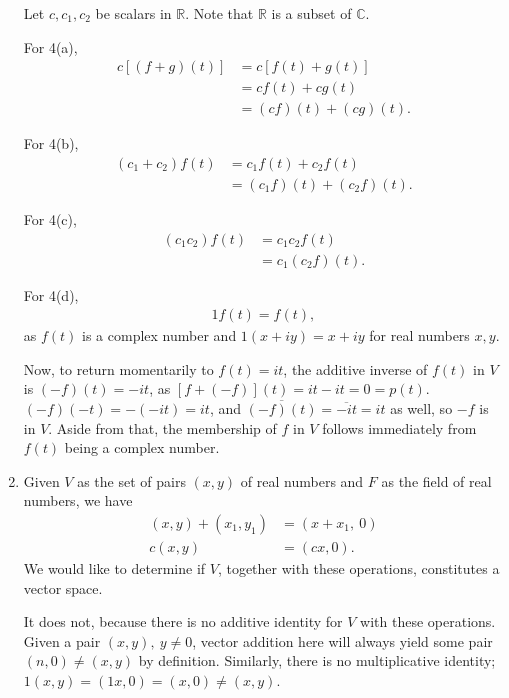\documentclass[12pt]{article}
\begin{document}
\begin{enumerate}
    Let $c,c_1,c_2$ be scalars in $\mathbb{R}$. Note that $\mathbb{R}$ is a subset of
    $\mathbb{C}$.

    For 4(a),
    \begin{align*}
      c[(f + g)(t)] &= c[f(t) + g(t)]\\
                    &= cf(t) + cg(t)\\
                    &= (cf)(t) + (cg)(t).
    \end{align*}

    For 4(b),
    \begin{align*}
      (c_1 + c_2)f(t) &= c_1f(t) + c_2f(t)\\
                      &= (c_1f)(t) + (c_2f)(t).
    \end{align*}

    For 4(c),
    \begin{align*}
      (c_1c_2)f(t) &= c_1c_2f(t)\\
                   &= c_1(c_2f)(t).
    \end{align*}

    For 4(d),
    \begin{align*}
      1f(t) = f(t),
    \end{align*}
    as $f(t)$ is a complex number and $1(x + iy) = x + iy$ for real numbers $x,y$.

    Now, to return momentarily to $f(t) = it$, the additive inverse of $f(t)$ in $V$
    is $(-f)(t) = -it$, as $[f + (-f)](t) = it - it = 0 = p(t)$. $(-f)(-t) = -(-it) =
    it$, and $\overline{(-f)(t)} = \overline{-it} = it$ as well, so $-f$ is in $V$.
    Aside from that, the membership of $f$ in $V$ follows immediately from $f(t)$
    being a complex number.

  \item
    Given $V$ as the set of pairs $(x,y)$ of real numbers and $F$ as the field of
    real numbers, we have
    \begin{align*}
      (x,y) + (x_1,y_1) &= (x + x_1,\ 0)\\
      c(x,y) &= (cx,0).
    \end{align*}
    We would like to determine if $V$, together with these operations, constitutes a
    vector space.

    It does not, because there is no additive identity for $V$ with these
    operations. Given a pair $(x,y),\ y \neq 0$, vector addition here will always
    yield some pair $(n,0) \neq (x,y)$ by definition. Similarly, there is no
    multiplicative identity; $1(x,y) = (1x,0) = (x,0) \neq (x,y)$. 
\end{enumerate}
\end{document}
